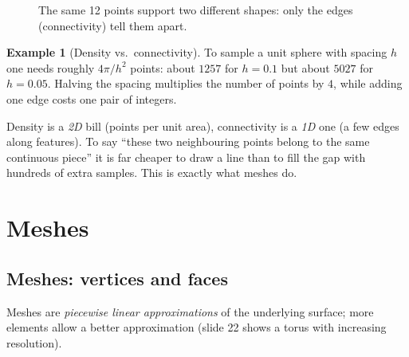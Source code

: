 \documentclass[11pt,a4paper]{article}
\theoremstyle{definition}
\newtheorem{example}[definition]{Example}
\theoremstyle{plain}
\theoremstyle{remark}
\begin{document}
\begin{figure}[ht]
\centering
{}
\caption{The same 12 points support two different shapes: only the edges (connectivity) tell them apart.}
\end{figure}

\begin{example}[Density vs.\ connectivity]
To sample a unit sphere with spacing $h$ one needs roughly $4\pi/h^2$ points: about $1257$ for $h=0.1$ but about $5027$ for $h=0.05$. Halving the spacing multiplies the number of points by $4$, while adding one edge costs one pair of integers.
\end{example}

\begin{intuition}
Density is a \emph{2D} bill (points per unit area), connectivity is a \emph{1D} one (a few edges along features). To say ``these two neighbouring points belong to the same continuous piece'' it is far cheaper to draw a line than to fill the gap with hundreds of extra samples. This is exactly what meshes do.
\end{intuition}

\section{Meshes }

\subsection{Meshes: vertices and faces }
Meshes are \emph{piecewise linear approximations} of the underlying surface; more elements allow a better approximation (slide 22 shows a torus with increasing resolution).
\end{document}
